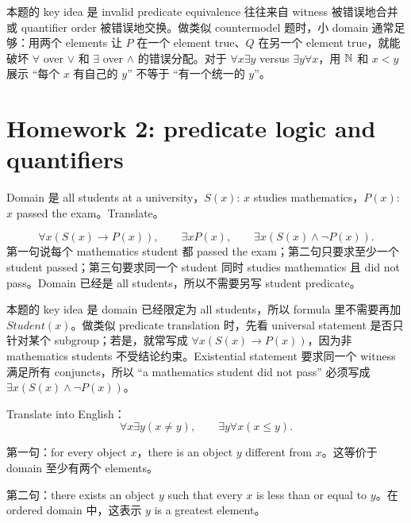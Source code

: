 \begin{explanation}
本题的 key idea 是 invalid predicate equivalence 往往来自 witness 被错误地合并或 quantifier order 被错误地交换。做类似 countermodel 题时，小 domain 通常足够：用两个 elements 让 \(P\) 在一个 element true、\(Q\) 在另一个 element true，就能破坏 \(\forall\) over \(\lor\) 和 \(\exists\) over \(\land\) 的错误分配。对于 \(\forall x\exists y\) versus \(\exists y\forall x\)，用 \(\mathbb{N}\) 和 \(x<y\) 展示 ``每个 \(x\) 有自己的 \(y\)'' 不等于 ``有一个统一的 \(y\)''。
\end{explanation}

\section{Homework 2: predicate logic and quantifiers}

\begin{exerciseblock}
Domain 是 all students at a university，\(S(x)\): \(x\) studies mathematics，\(P(x)\): \(x\) passed the exam。Translate。
\end{exerciseblock}

\begin{solution}
\[
\forall x(S(x)\to P(x)),\qquad
\exists xP(x),\qquad
\exists x(S(x)\land\lnot P(x)).
\]
第一句说每个 mathematics student 都 passed the exam；第二句只要求至少一个 student passed；第三句要求同一个 student 同时 studies mathematics 且 did not pass。Domain 已经是 all students，所以不需要另写 student predicate。
\end{solution}

\begin{explanation}
本题的 key idea 是 domain 已经限定为 all students，所以 formula 里不需要再加 \(Student(x)\)。做类似 predicate translation 时，先看 universal statement 是否只针对某个 subgroup；若是，就常写成 \(\forall x(S(x)\to P(x))\)，因为非 mathematics students 不受结论约束。Existential statement 要求同一个 witness 满足所有 conjuncts，所以 ``a mathematics student did not pass'' 必须写成 \(\exists x(S(x)\land\lnot P(x))\)。
\end{explanation}

\begin{exerciseblock}
Translate into English：
\[
\forall x\exists y(x\ne y),\qquad \exists y\forall x(x\le y).
\]
\end{exerciseblock}

\begin{solution}
第一句：for every object \(x\)，there is an object \(y\) different from \(x\)。这等价于 domain 至少有两个 elements。

第二句：there exists an object \(y\) such that every \(x\) is less than or equal to \(y\)。在 ordered domain 中，这表示 \(y\) is a greatest element。
\end{solution}

